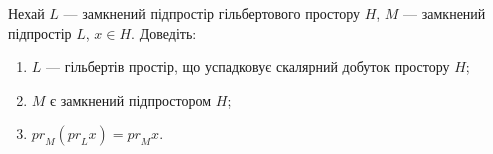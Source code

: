 \begin{exercise}
    Нехай $L$ --- замкнений підпростір гільбертового простору $H$, $M$ --- замкнений підпростір $L$, $x \in H$.
    Доведіть:
    \begin{enumerate}[label=\ukr*)]
        \item $L$ --- гільбертів простір, що успадковує скалярний добуток простору $H$;
        \item $M$ є замкнений підпростором $H$;
        \item ${pr}_M({pr}_L x) = {pr}_M x$.
    \end{enumerate}
\end{exercise}
